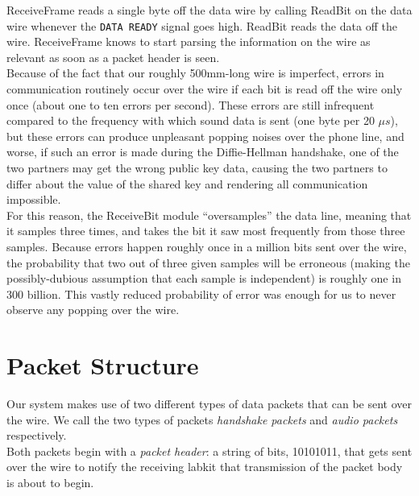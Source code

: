 \documentclass[a4paper]{report}
\begin{document}
ReceiveFrame reads a single byte off the data wire by calling ReadBit on the data wire whenever the \verb|DATA READY| signal goes high. ReadBit reads the data off the wire. ReceiveFrame knows to start parsing the information on the wire as relevant as soon as a packet header is seen. \\

Because of the fact that our roughly 500mm-long wire is imperfect, errors in communication routinely occur over the wire if each bit is read off the wire only once (about one to ten errors per second). These errors are still infrequent compared to the frequency with which sound data is sent (one byte per 20 $\mu s$), but these errors can produce unpleasant popping noises over the phone line, and worse, if such an error is made during the Diffie-Hellman handshake, one of the two partners may get the wrong public key data, causing the two partners to differ about the value of the shared key and rendering all communication impossible. \\

For this reason, the ReceiveBit module ``oversamples'' the data line, meaning that it samples three times, and takes the bit it saw most frequently from those three samples. Because errors happen roughly once in a million bits sent over the wire, the probability that two out of three given samples will %
 be erroneous (making the possibly-dubious assumption that each sample is independent) is roughly one in 300 billion. This vastly reduced probability of error was enough for us to never observe any popping over the wire.

\section{Packet Structure}

Our system makes use of two different types of data packets that can be sent over the wire. We call the two types of packets \emph{handshake packets} and \emph{audio packets} respectively.  \\


Both packets begin with a \emph{packet header}: a string of bits, 10101011, that gets sent over the wire to notify the receiving labkit that transmission of the packet body is about to begin.  \\
\end{document}
